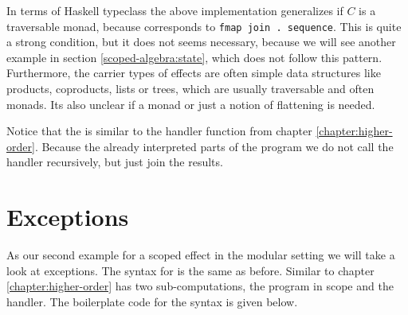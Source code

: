 In terms of Haskell typeclass the above implementation generalizes if $C$ is a
traversable monad, because  corresponds to
\texttt{fmap join . sequence}.
This is quite a strong condition, but it does not seems necessary, because we
will see another example in section \ref{scoped-algebra:state}, which does not
follow this pattern.
Furthermore, the carrier types of effects are often simple data structures like
products, coproducts, lists or trees, which are usually traversable and often
monads.
Its also unclear if a monad or just a notion of flattening is needed.

Notice that the  is similar to the handler function from
chapter \ref{chapter:higher-order}.
Because the  already interpreted parts of the program we do
not call the handler recursively, but just join the results.


\section{Exceptions}

As our second example for a scoped effect in the modular setting we will take a
look at exceptions.
The syntax for  is the same as before.
Similar to chapter \ref{chapter:higher-order}  has two
sub-computations, the program in scope and the handler.
The boilerplate code for the syntax is given below.

